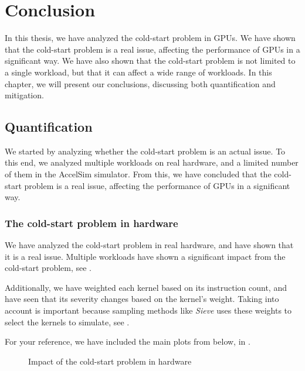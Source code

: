 \chapter{Conclusion}\label{ch:conclusion}

In this thesis, we have analyzed the cold-start problem in GPUs.
We have shown that the cold-start problem is a real issue, affecting the performance of GPUs in a significant way.
We have also shown that the cold-start problem is not limited to a single workload, but that it can affect a wide range of workloads.
In this chapter, we will present our conclusions, discussing both quantification and mitigation.

\section{Quantification}\label{sec:quantification}
We started by analyzing whether the cold-start problem is an actual issue.
To this end, we analyzed multiple workloads on real hardware, and a limited number of them in the AccelSim simulator.
From this, we have concluded that the cold-start problem is a real issue, affecting the performance of GPUs in a significant way.

\subsection{The cold-start problem in hardware}\label{subsec:cold-start-in-hardware}
We have analyzed the cold-start problem in real hardware, and have shown that it is a real issue.
Multiple workloads have shown a significant impact from the cold-start problem, see .

Additionally, we have weighted each kernel based on its instruction count, and have seen that its severity changes based on the kernel's weight.
Taking into account is important because sampling methods like \textit{Sieve} uses these weights to select the kernels to simulate, see .

For your reference, we have included the main plots from  below, in .

\begin{figure}[ht]
    \centering
    \caption{Impact of the cold-start problem in hardware}
    \label{fig:concl-hw-impact}
\end{figure}

